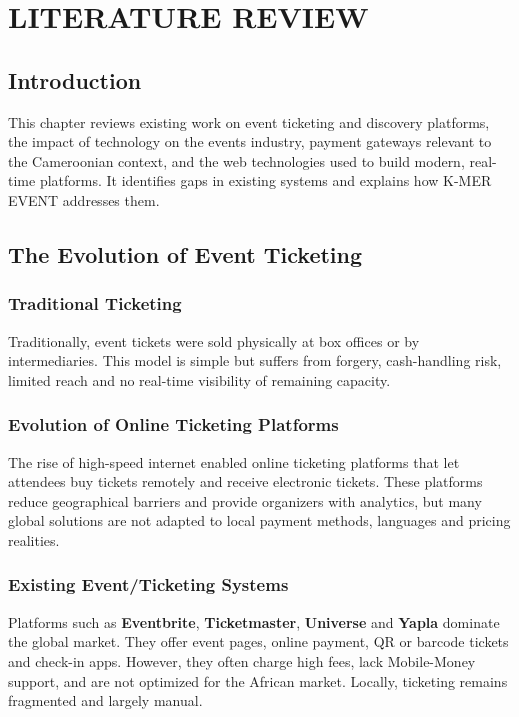 \documentclass[12pt,a4paper]{report}
\begin{document}
\chapter{LITERATURE REVIEW}

\section{Introduction}
This chapter reviews existing work on event ticketing and discovery platforms, the impact of
technology on the events industry, payment gateways relevant to the Cameroonian context, and
the web technologies used to build modern, real-time platforms. It identifies gaps in
existing systems and explains how K-MER EVENT addresses them.

\section{The Evolution of Event Ticketing}
\subsection{Traditional Ticketing}
Traditionally, event tickets were sold physically at box offices or by intermediaries. This
model is simple but suffers from forgery, cash-handling risk, limited reach and no real-time
visibility of remaining capacity.

\subsection{Evolution of Online Ticketing Platforms}
The rise of high-speed internet enabled online ticketing platforms that let attendees buy
tickets remotely and receive electronic tickets. These platforms reduce geographical
barriers and provide organizers with analytics, but many global solutions are not adapted to
local payment methods, languages and pricing realities.

\subsection{Existing Event/Ticketing Systems}
Platforms such as \textbf{Eventbrite}, \textbf{Ticketmaster}, \textbf{Universe} and
\textbf{Yapla} dominate the global market. They offer event pages, online payment, QR or
barcode tickets and check-in apps. However, they often charge high fees, lack Mobile-Money
support, and are not optimized for the African market. Locally, ticketing remains
fragmented and largely manual.
\end{document}
